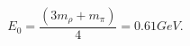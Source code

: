 \begin{equation}                              
E_{0}= \frac{(3 m_{\rho} + m_{\pi})}{4} = 0.61 GeV.                               
\end{equation} 
